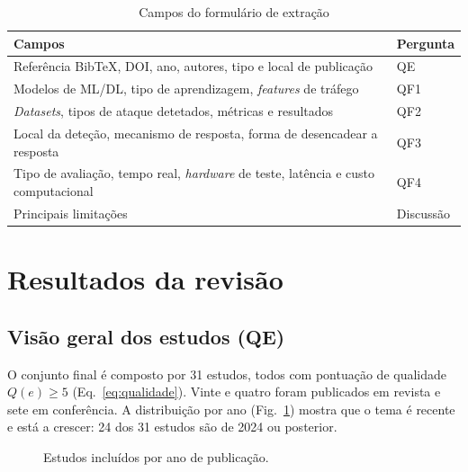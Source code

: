 \documentclass[conference,a4paper]{IEEEtran}
\begin{document}
\begin{table}[H]
\caption{Campos do formulário de extração}\label{tab:extracao}
\centering\footnotesize
\begin{tabular}{@{}p{}p{}@{}}
\toprule
Campos & Pergunta \\
\midrule
Referência BibTeX, DOI, ano, autores, tipo e local de publicação & QE \\
Modelos de ML/DL, tipo de aprendizagem, \textit{features} de tráfego & QF1 \\
\textit{Datasets}, tipos de ataque detetados, métricas e resultados & QF2 \\
Local da deteção, mecanismo de resposta, forma de desencadear a resposta & QF3 \\
Tipo de avaliação, tempo real, \textit{hardware} de teste, latência e custo computacional & QF4 \\
Principais limitações & Discussão \\
\bottomrule
\end{tabular}
\end{table}

\section{Resultados da revisão}\label{sec:resultados}
\subsection{Visão geral dos estudos (QE)}
O conjunto final é composto por 31 estudos, todos
com pontuação de qualidade $Q(e) \ge 5$ (Eq.~\ref{eq:qualidade}). Vinte e quatro foram publicados em revista e sete em conferência. A distribuição por ano
(Fig.~\ref{fig:anos}) mostra que o tema é recente e está a crescer: 24 dos 31 estudos são
de 2024 ou posterior.

\begin{figure}[H]
\centering
{}
\caption{Estudos incluídos por ano de publicação.}\label{fig:anos}
\end{figure}
\end{document}
